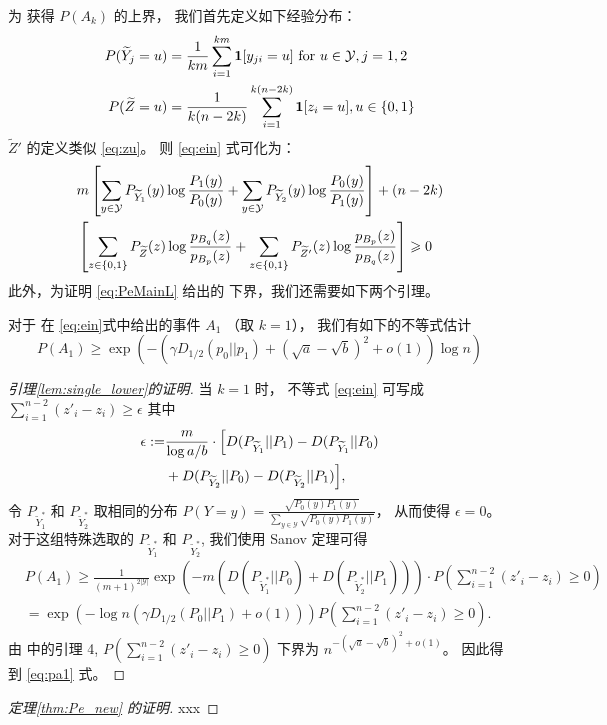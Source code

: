     为
    获得 $P(A_k)$
    的上界， 
    我们首先定义如下经验分布：
    \begin{align}
    P(\widetilde{Y}_j = u) &=
    \frac{1}{km} \sum_{i=1}^{km}
    \mathbf{1}[y_{ji} = u] \textrm{ for } u \in \mathcal{Y}, j=1,2 
    \notag \\
    P(\widetilde{Z} = u) &= \frac{1}{k(n-2k)}\sum_{i=1}^{k(n-2k)} \mathbf{1}[z_i = u], u \in \{0, 1\}
    \label{eq:zu}
    \end{align}
     $\widetilde{Z}'$ 
     的定义类似 \eqref{eq:zu}。
 则
    \eqref{eq:ein} 式可化为：
    \begin{align}
    &m\left[\sum_{y\in \mathcal{Y}}
    P_{\widetilde{Y}_1}(y)\log\frac{P_1(y)}
    {P_0(y)}
    +\sum_{y\in \mathcal{Y}}
    P_{\widetilde{Y}_2}(y)\log\frac{P_0(y)}
    {P_1(y)}
    \right] +(n-2k)\notag \\
    &\left[\sum_{z\in\{0,1\}} P_{\widetilde{Z}}(z) \log \frac{p_{B_q}(z)}{p_{B_p}(z)}
    + \sum_{z\in\{0,1\}} P_{\widetilde{Z}'}(z) \log \frac{p_{B_p}(z)}{p_{B_q}(z)}\right] \geq 0 \label{eq:mnk}
    \end{align}
    此外，为证明 \eqref{eq:PeMainL} 给出的
    下界，我们还需要如下两个引理。
    \begin{lemma}\label{lem:single_lower}
        对于 
         在 \eqref{eq:ein}式中给出的事件 $A_1$ 
          （取 $k=1$），
        我们有如下的不等式估计
        \begin{equation}\label{eq:pa1}
        P(A_1) \geq \exp(-(\gamma D_{1/2}(p_0||p_1) + (\sqrt{a}-\sqrt{b})^2 + o(1))\log n )
        \end{equation}
        \end{lemma}
        \begin{proof}[引理\ref{lem:single_lower}的证明] 
当 $k=1$ 时，
不等式 \eqref{eq:ein} 可写成
$\sum_{i=1}^{n-2} (z'_i - z_i)
\geq \epsilon$
其中
\begin{align*}
\epsilon := &\frac{m}{\log a/b}\cdot 
\Bigl[D(P_{\widetilde{Y}_{1}} || P_1) 
- D(P_{\widetilde{Y}_{1}} || P_0) \\
&+D(P_{\widetilde{Y}_{2}} || P_0) -
D(P_{\widetilde{Y}_{2}} || P_1)\Bigr],
\end{align*}
令 $P_{\widetilde{Y}^{*}_1}$
和 $P_{\widetilde{Y}^{*}_2}$
取相同的分布
$P(Y=y)=\frac{\sqrt{P_0(y)P_1(y)}}
{ \sum_{y\in \mathcal{Y}}
\sqrt{P_0(y) P_1(y)}} $，
从而使得 $\epsilon =0$。
对于这组特殊选取的
$P_{\widetilde{Y}^{*}_1}$
和 $P_{\widetilde{Y}^{*}_2}$,
我们使用 Sanov 定理可得
\begin{align*}
&P(A_1)
\geq\frac{1}
{(m+1)^{2|\mathcal{Y}|}}
\exp \left(-m(D(P_{\widetilde{Y}^*_1} || P_0)
+ D(P_{\widetilde{Y}^*_2} || P_1))
\right)
\cdot P\left(\sum_{i=1}^{n-2} (z'_i - z_i) \geq 0\right)\\
& = \exp(-\log n (\gamma D_{1/2}(P_0||P_1)+o(1))) P(\sum_{i=1}^{n-2} (z'_i - z_i) \geq 0).
\end{align*}
由 \citet{abbe2015exact}
中的引理 4,
$P(\sum_{i=1}^{n-2} (z'_i - z_i) \geq 0)$ 下界为
 $n^{-(\sqrt{a} - \sqrt{b})^2 + o(1)}$。
因此得到 \eqref{eq:pa1} 式。
        \end{proof}
\begin{proof}[定理\ref{thm:Pe_new} 的证明]
xxx
\end{proof}
